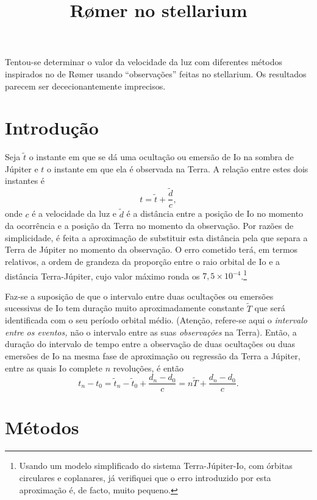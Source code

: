 \documentclass[]{article}
\title{R{\o}mer no stellarium}
\author{}
\begin{document}
\maketitle

\abstract
\noindent
Tentou-se determinar o valor da velocidade da luz com diferentes métodos
inspirados no de R{\o}mer usando ``observações'' feitas no stellarium. Os
resultados parecem ser dececionantemente imprecisos.


\section{Introdução}
Seja $\tilde t$ o instante em que se dá uma ocultação ou emersão de Io na sombra
de Júpiter e $t$ o instante em que ela é observada na Terra. A relação entre
estes dois instantes é
\begin{equation}
  t=\tilde t+\frac{\tilde d}{c},
\end{equation}
onde $c$ é a velocidade da luz e $\tilde d$ é a distância entre a posição de Io no
momento da ocorrência e a posição da Terra no momento da observação. Por razões
de simplicidade, é feita a aproximação de substituir esta distância pela que
separa a Terra de Júpiter no momento da observação. O erro cometido terá, em
termos relativos, a ordem de grandeza da proporção entre o raio orbital de Io e
a distância Terra-Júpiter, cujo valor máximo ronda os
$7,5\times10^{-4}$.\footnote{Usando um modelo simplificado do sistema
  Terra-Júpiter-Io, com órbitas circulares e coplanares, já verifiquei que o
  erro introduzido por esta aproximação é, de facto,
muito pequeno.}

Faz-se a suposição de que o intervalo entre duas ocultações ou emersões
sucessivas de Io tem duração muito aproximadamente constante $\tilde T$ que será
identificada com o seu período orbital médio.  (Atenção, refere-se aqui o
\emph{intervalo entre os eventos,} não o intervalo entre as suas
\emph{observações} na Terra). Então, a duração do intervalo de tempo entre a
observação de duas ocultações ou duas emersões de Io na mesma fase de
aproximação ou regressão da Terra a Júpiter, entre as quais Io complete $n$
revoluções, é então
\begin{equation}\label{eq:aa}
  t_n-t_0=\tilde t_n-\tilde t_0 + \frac{d_n-d_0}{c}=n\tilde T+
  \frac{d_n-d_0}{c}.
\end{equation}

\section{Métodos}
\end{document}
